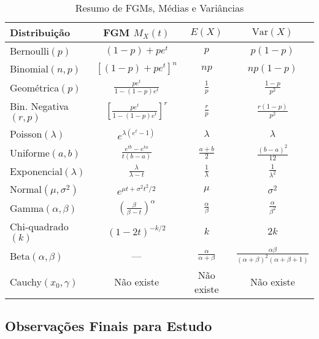 \documentclass[12pt,a4paper]{article}
\theoremstyle{plain}
\theoremstyle{definition}
\theoremstyle{remark}
\begin{document}
\begin{table}[h]
\centering
\small
\begin{tabular}{|l|c|c|c|}
\hline
\textbf{Distribuição} & \textbf{FGM} \(M_X(t)\) & \(E(X)\) & \(\text{Var}(X)\) \\
\hline
\hline
Bernoulli\((p)\) & \((1-p) + pe^t\) & \(p\) & \(p(1-p)\) \\
\hline
Binomial\((n,p)\) & \([(1-p) + pe^t]^n\) & \(np\) & \(np(1-p)\) \\
\hline
Geométrica\((p)\) & \(\frac{pe^t}{1-(1-p)e^t}\) & \(\frac{1}{p}\) & \(\frac{1-p}{p^2}\) \\
\hline
Bin. Negativa\((r,p)\) & \(\left[\frac{pe^t}{1-(1-p)e^t}\right]^r\) & \(\frac{r}{p}\) & \(\frac{r(1-p)}{p^2}\) \\
\hline
Poisson\((\lambda)\) & \(e^{\lambda(e^t-1)}\) & \(\lambda\) & \(\lambda\) \\
\hline
\hline
Uniforme\((a,b)\) & \(\frac{e^{tb}-e^{ta}}{t(b-a)}\) & \(\frac{a+b}{2}\) & \(\frac{(b-a)^2}{12}\) \\
\hline
Exponencial\((\lambda)\) & \(\frac{\lambda}{\lambda-t}\) & \(\frac{1}{\lambda}\) & \(\frac{1}{\lambda^2}\) \\
\hline
Normal\((\mu,\sigma^2)\) & \(e^{\mu t + \sigma^2t^2/2}\) & \(\mu\) & \(\sigma^2\) \\
\hline
Gamma\((\alpha,\beta)\) & \(\left(\frac{\beta}{\beta-t}\right)^\alpha\) & \(\frac{\alpha}{\beta}\) & \(\frac{\alpha}{\beta^2}\) \\
\hline
Chi-quadrado\((k)\) & \((1-2t)^{-k/2}\) & \(k\) & \(2k\) \\
\hline
Beta\((\alpha,\beta)\) & --- & \(\frac{\alpha}{\alpha+\beta}\) & \(\frac{\alpha\beta}{(\alpha+\beta)^2(\alpha+\beta+1)}\) \\
\hline
Cauchy\((x_0,\gamma)\) & Não existe & Não existe & Não existe \\
\hline
\end{tabular}
\caption{Resumo de FGMs, Médias e Variâncias}
\end{table}

\subsection{Observações Finais para Estudo}
\end{document}
